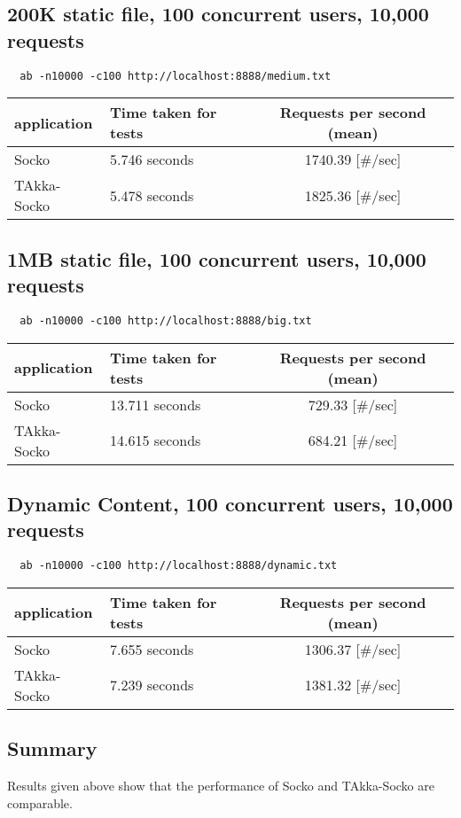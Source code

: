 \documentclass[11pt, a4paper]{article}
\begin{document}
\subsection{200K static file, 100 concurrent users, 10,000 requests}
\begin{verbatim}
  ab -n10000 -c100 http://localhost:8888/medium.txt
\end{verbatim}
\begin{table}[h]
\begin{tabularx}{\textwidth}{ |l|X|c| }
  \hline
  application & Time taken for tests & Requests per second (mean)  \\
  \hline
  Socko  & 5.746 seconds  &1740.39 [\#/sec]  \\
  \hline
  TAkka-Socko  & 5.478 seconds  &1825.36 [\#/sec] \\
  \hline  
\end{tabularx}
\end{table}

\subsection{1MB static file, 100 concurrent users, 10,000 requests}
\begin{verbatim}
  ab -n10000 -c100 http://localhost:8888/big.txt
\end{verbatim}

\begin{table}[h]
\begin{tabularx}{\textwidth}{ |l|X|c| }
  \hline
  application & Time taken for tests & Requests per second (mean)  \\
  \hline
  Socko  & 13.711 seconds & 729.33 [\#/sec] \\
  \hline
  TAkka-Socko  & 14.615 seconds  & 684.21 [\#/sec]  \\
  \hline  
\end{tabularx}

\subsection{Dynamic Content, 100 concurrent users, 10,000 requests}
\begin{verbatim}
  ab -n10000 -c100 http://localhost:8888/dynamic.txt
\end{verbatim}
\end{table}

\begin{tabularx}{\textwidth}{ |l|X|c| }
  \hline
  application & Time taken for tests & Requests per second (mean)  \\
  \hline
  Socko  & 7.655 seconds  & 1306.37 [\#/sec]  \\
  \hline
  TAkka-Socko  & 7.239 seconds  &1381.32 [\#/sec] \\
  \hline  
\end{tabularx}

\subsection{Summary}
Results given above show that the performance of Socko and TAkka-Socko are comparable. 



\end{document}
